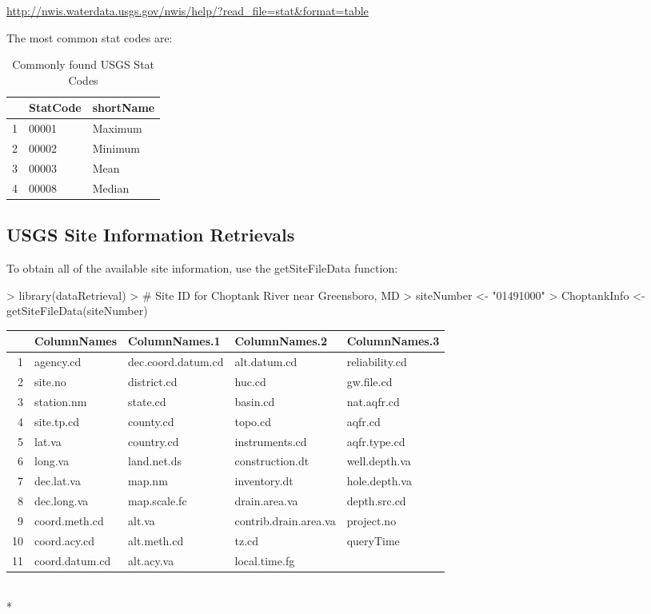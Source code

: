 \documentclass[a4paper,11pt]{article}
\begin{document}
\url{http://nwis.waterdata.usgs.gov/nwis/help/?read_file=stat&format=table}

The most common stat codes are:
\begin{table}[ht]
\begin{center}
\caption{Commonly found USGS Stat Codes}
\begin{tabular}{rll}
  \hline
 & StatCode & shortName \\ 
  \hline
1 & 00001 & Maximum \\ 
  2 & 00002 & Minimum \\ 
  3 & 00003 & Mean \\ 
  4 & 00008 & Median \\ 
   \hline
\end{tabular}
\end{center}
\end{table}

\subsection{USGS Site Information Retrievals}
To obtain all of the available site information, use the getSiteFileData function:
\begin{Schunk}
\begin{Sinput}
> library(dataRetrieval)
> # Site ID for Choptank River near Greensboro, MD
> siteNumber <- "01491000" 
> ChoptankInfo <- getSiteFileData(siteNumber)
\end{Sinput}
\end{Schunk}


\begin{tabular}{rllll}
  \hline
 & ColumnNames & ColumnNames.1 & ColumnNames.2 & ColumnNames.3 \\ 
  \hline
1 & agency.cd & dec.coord.datum.cd & alt.datum.cd & reliability.cd \\ 
  2 & site.no & district.cd & huc.cd & gw.file.cd \\ 
  3 & station.nm & state.cd & basin.cd & nat.aqfr.cd \\ 
  4 & site.tp.cd & county.cd & topo.cd & aqfr.cd \\ 
  5 & lat.va & country.cd & instruments.cd & aqfr.type.cd \\ 
  6 & long.va & land.net.ds & construction.dt & well.depth.va \\ 
  7 & dec.lat.va & map.nm & inventory.dt & hole.depth.va \\ 
  8 & dec.long.va & map.scale.fc & drain.area.va & depth.src.cd \\ 
  9 & coord.meth.cd & alt.va & contrib.drain.area.va & project.no \\ 
  10 & coord.acy.cd & alt.meth.cd & tz.cd & queryTime \\ 
  11 & coord.datum.cd & alt.acy.va & local.time.fg &  \\ 
   \hline
\end{tabular}\\*
\end{document}
